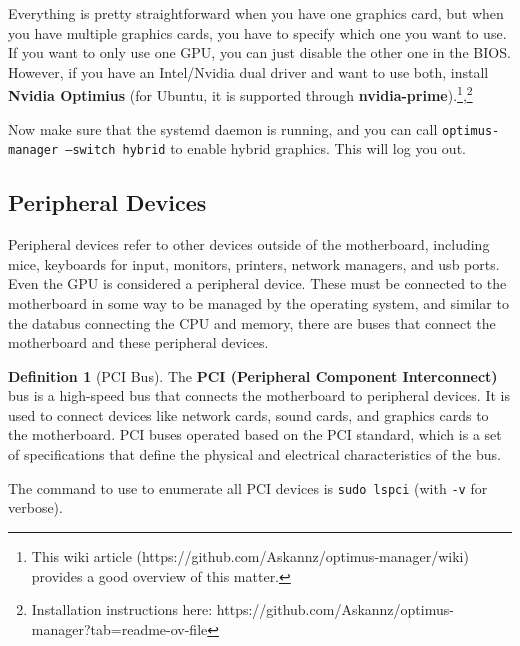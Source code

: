\documentclass{article}
\theoremstyle{definition}
\newtheorem{definition}{Definition}[section]
\begin{document}
      Everything is pretty straightforward when you have one graphics card, but when you have multiple graphics cards, you have to specify which one you want to use. If you want to only use one GPU, you can just disable the other one in the BIOS. However, if you have an Intel/Nvidia dual driver and want to use both, install \textbf{Nvidia Optimius} (for Ubuntu, it is supported through \textbf{nvidia-prime}).\footnote{This wiki article (https://github.com/Askannz/optimus-manager/wiki) provides a good overview of this matter. },\footnote{Installation instructions here: https://github.com/Askannz/optimus-manager?tab=readme-ov-file} 

      Now make sure that the systemd daemon is running, and you can call \texttt{optimus-manager --switch hybrid} to enable hybrid graphics. This will log you out. 

    \subsection{Peripheral Devices} 
      
      Peripheral devices refer to other devices outside of the motherboard, including mice, keyboards for input, monitors, printers, network managers, and usb ports. Even the GPU is considered a peripheral device. These must be connected to the motherboard in some way to be managed by the operating system, and similar to the databus connecting the CPU and memory, there are buses that connect the motherboard and these peripheral devices. 

      \begin{definition}[PCI Bus]
        The \textbf{PCI (Peripheral Component Interconnect)} bus is a high-speed bus that connects the motherboard to peripheral devices. It is used to connect devices like network cards, sound cards, and graphics cards to the motherboard. PCI buses operated based on the PCI standard, which is a set of specifications that define the physical and electrical characteristics of the bus. 
      \end{definition}

      The command to use to enumerate all PCI devices is \texttt{sudo lspci} (with \texttt{-v} for verbose). 
      
\end{document}
